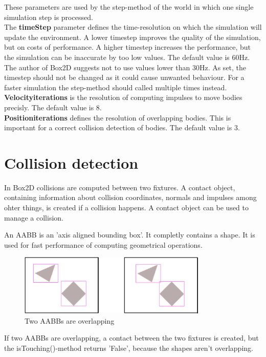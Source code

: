 \documentclass[10pt,a4paper,DIV=11]{scrreprt}
\begin{document}
These parameters are used by the step-method of the world in which one single simulation step is processed. \\

The \textbf{timeStep} parameter defines the time-resolution on which the simulation will update the environment. A lower timestep improves the quality of the simulation, but on costs of performance. A higher timestep increases the performance, but the simulation can be inaccurate by too low values.
The default value is 60Hz. The author of Box2D suggests not to use values lower than 30Hz. As set, the timestep should not be changed as it could cause unwanted behaviour. For a faster simulation the step-method should called multiple times instead. \\


\textbf{Velocityiterations} is the resolution of computing impulses to move bodies precisly. The default value is 8. \\

\textbf{Positioniterations} defines the resolution of overlapping bodies. This is important for a correct collision detection of bodies. The default value is 3. \\

\cite{box} \cite{iforce}


\section{Collision detection}
In Box2D collisions are computed between two fixtures. A contact object, containing information about collision coordinates, normals and impulses among ohter things, is created if a collision happens. A contact object can be used to manage a collision.

An AABB is an 'axis aligned bounding box'. It completly contains a shape. It is used for fast performance of computing geometrical operations.\cite{aabb}

\begin{center}
	\begin{figure}[H]
		\centering
		\includegraphics[width=0.8\textwidth,scale=1.0]{files/aabbs-crossing.png}  
		\caption{Two AABBs are overlapping \cite{iforce}}
		\label{fig:aabbs}
	\end{figure}
\end{center}
If two AABBs are overlapping, a contact between the two fixtures is created, but the isTouching()-method returns 'False', because the shapes aren't overlapping.
\end{document}

